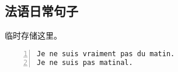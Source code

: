 \documentclass[11pt]{amsart}
\begin{document}
\subsection{法语日常句子}
临时存储这里。
\begin{lstlisting}[numbers=left,numberstyle=\tiny,numbersep=10pt]
Je ne suis vraiment pas du matin.
Je ne suis pas matinal.
\end{lstlisting}

 
   



 








\begin{thebibliography}{99}

 


  

\end{thebibliography}
\end{document}
